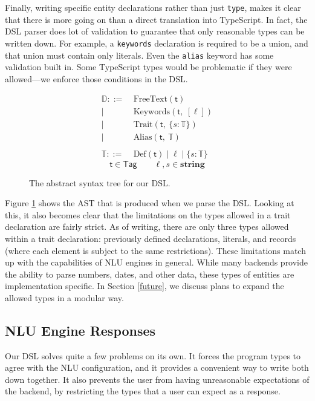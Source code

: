 \documentclass[twocolumn]{article}
\newcommand{\ts}[1]{\texttt{#1}}
\newcommand{\etag}[1]{\textsf{#1}}
\newcommand{\ff}[1]{\textsf{#1}}
\begin{document}
Finally, writing specific entity declarations rather than just \ts{type}, makes
it clear that there is more going on than a direct translation into TypeScript.
In fact, the DSL parser does lot of validation to guarantee that only reasonable
types can be written down. For example, a \ts{keywords} declaration is required
to be a union, and that union must contain only literals. Even the \ts{alias}
keyword has some validation built in. Some TypeScript types would be problematic
if they were allowed---we enforce those conditions in the DSL.

\begin{figure}
  \centering
  \begin{align*}
    \mathbb{D} ::=&\ \text{FreeText}(\etag{t}) \\
    |&\ \text{Keywords}(\etag{t},\ [\ell]) \\
    |&\ \text{Trait}(\etag{t},\ \{s: \mathbb{T}\}) \\
    |&\ \text{Alias}(\etag{t},\ \mathbb{T}) \\
    \\
    \mathbb{T} ::=&\ \text{Def}(\etag{t}) \mid \ell \mid \{s: \mathbb{T}\}
  \end{align*}
  $$ \etag{t} \in \ff{Tag} \qquad \ell, s \in \textbf{string} $$
  \caption{The abstract syntax tree for our DSL.}
  \label{fig:ast}
\end{figure}

Figure \ref{fig:ast} shows the AST that is produced when we parse the DSL.
Looking at this, it also becomes clear that the limitations on the types allowed
in a trait declaration are fairly strict. As of writing, there are only three
types allowed within a trait declaration: previously defined declarations,
literals, and records (where each element is subject to the same restrictions).
These limitations match up with the capabilities of NLU engines in general.
While many backends provide the ability to parse numbers, dates, and other data,
these types of entities are implementation specific. In Section \ref{future}, we
discuss plans to expand the allowed types in a modular way.

\subsection{NLU Engine Responses}
Our DSL solves quite a few problems on its own. It forces the program types to
agree with the NLU configuration, and it provides a convenient way to write both
down together. It also prevents the user from having unreasonable expectations
of the backend, by restricting the types that a user can expect as a response.
\end{document}
